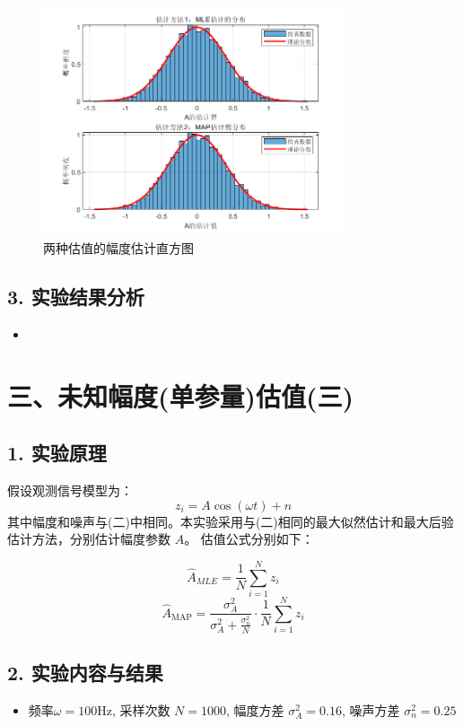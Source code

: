 \documentclass[12pt]{ctexart}
\begin{document}
\begin{figure}[H]
    \centering
    \includegraphics[width=0.8\textwidth]{image/output2.png}
    \caption{两种估值的幅度估计直方图}
\end{figure}

\subsection*{3. 实验结果分析}

\begin{itemize}
    \item 
\end{itemize}


\section*{三、未知幅度(单参量)估值(三)}

\subsection*{1. 实验原理}

假设观测信号模型为：
\[
    z_i = A\cos(\omega t) + n
\]
其中幅度和噪声与(二)中相同。本实验采用与(二)相同的最大似然估计和最大后验估计方法，分别估计幅度参数 \( A \)。
估值公式分别如下：

\[
\hat{A}_{MLE} = \frac{1}{N} \sum_{i=1}^{N} z_i
\]
\[
\hat{A}_{\text{MAP}} = \frac{\sigma_A^2}{\sigma_A^2 + \frac{\sigma_n^2}{N}} \cdot \frac{1}{N} \sum_{i=1}^{N} z_i 
\]
\subsection*{2. 实验内容与结果}

\begin{itemize}
    \item 频率$\omega = 100 $Hz, 采样次数 \( N = 1000 \), 幅度方差 \( \sigma_A^2 = 0.16 \), 噪声方差 \( \sigma_n^2 = 0.25 \)
\end{itemize}
\end{document}

